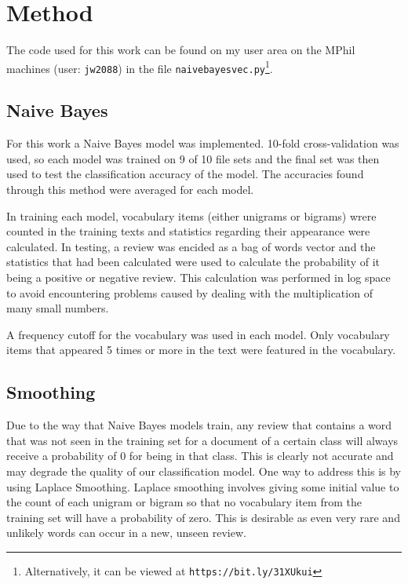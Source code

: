 \documentclass[twocolumn]{article}
\begin{document}
\section{Method}


The code used for this work can be found on my user area on the MPhil machines (user: \texttt{jw2088}) in the file \texttt{naivebayesvec.py}\footnote{Alternatively, it can be viewed at \texttt{https://bit.ly/31XUkui}}.

\subsection{Naive Bayes}

For this work a Naive Bayes model was implemented. 10-fold cross-validation was used, so each model was trained on 9 of 10 file sets and the final set was then used to test the classification accuracy of the model. The accuracies found through this method were averaged for each model. 

In training each model, vocabulary items (either unigrams or bigrams) wrere counted in the training texts and statistics regarding their appearance were calculated. In testing, a review was encided as a bag of words vector and the statistics that had been calculated were used to calculate the probability of it being a positive or negative review. This calculation was performed in log space to avoid encountering problems caused by dealing with the multiplication of many small numbers.

A frequency cutoff for the vocabulary was used in each model. Only vocabulary items that appeared 5 times or more in the text were featured in the vocabulary.

\subsection{Smoothing}

Due to the way that Naive Bayes models train, any review that contains a word that was not seen in the training set for a document of a certain class will always receive a probability of 0 for being in that class. This is clearly not accurate and may degrade the quality of our classification model. One way to address this is by using Laplace Smoothing. Laplace smoothing involves giving some initial value to the count of each unigram or bigram so that no vocabulary item from the training set will have a probability of zero. This is desirable as even very rare and unlikely words can occur in a new, unseen review.
\end{document}
